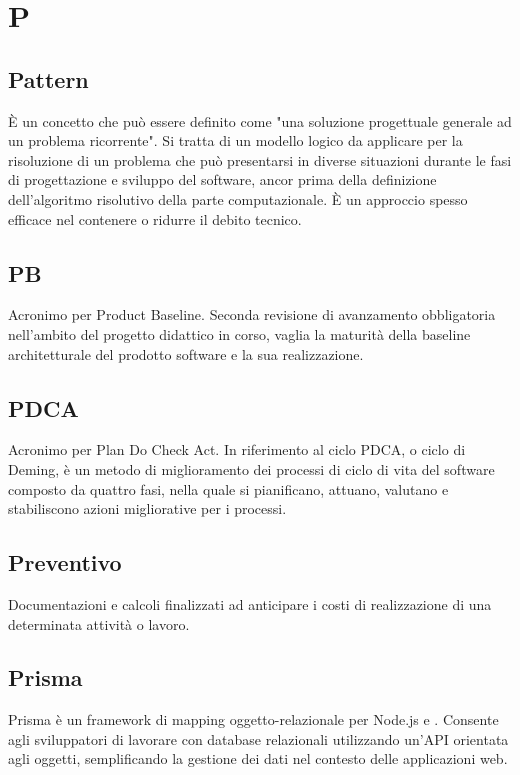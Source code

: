 \chapter{P}

\section{Pattern}
È un concetto che può essere definito come "una soluzione progettuale generale ad un problema ricorrente". Si tratta di un modello logico da applicare per la risoluzione di un problema che può presentarsi in diverse situazioni durante le fasi di progettazione e sviluppo del software, ancor prima della definizione dell'algoritmo risolutivo della parte computazionale. È un approccio spesso efficace nel contenere o ridurre il debito tecnico. 

\section{PB}\label{sec:Product Baseline}
Acronimo per Product Baseline. Seconda revisione di avanzamento obbligatoria nell'ambito del progetto didattico in corso, vaglia la maturità della baseline architetturale del prodotto software e la sua realizzazione.

\section{PDCA}\label{sec:Plan Do Check Act}
Acronimo per Plan Do Check Act. In riferimento al ciclo PDCA, o ciclo di Deming, è un metodo di miglioramento dei processi di ciclo di vita del software composto da quattro fasi, nella quale si pianificano, attuano, valutano e stabiliscono azioni migliorative per i processi.

\section{Preventivo}\label{sec:Preventivi}
Documentazioni e calcoli finalizzati ad anticipare i costi di realizzazione di una determinata attività o lavoro.

\section{Prisma}
Prisma  è un framework di mapping oggetto-relazionale per Node.js e . Consente agli sviluppatori di lavorare con database relazionali utilizzando un'API orientata agli oggetti, semplificando la gestione dei dati nel contesto delle applicazioni web.

